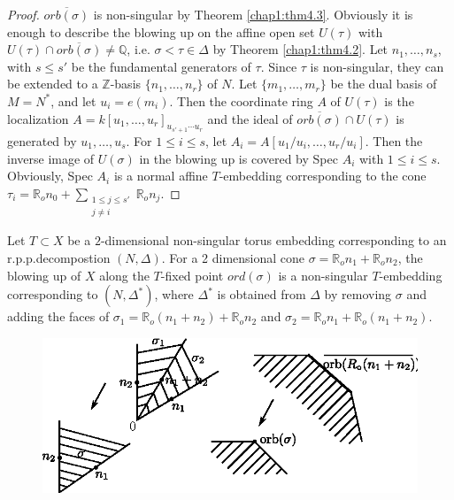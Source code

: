  \begin{proof}
$\overline{orb (\sigma)}$ is non-singular by Theorem
   \ref{chap1:thm4.3}. Obviously it 
   is enough to describe the blowing up on the affine open set
   $U(\tau)$ with $U(\tau) \cap \overline{orb(\sigma)} \neq
   \mathbb{Q}$, i.e. $\sigma < \tau \in \Delta$ by Theorem
   \ref{chap1:thm4.2}. Let   $n_1, \ldots, n_s$, with $s \le s'$ be
   the fundamental generators 
   of $\tau$. Since $\tau$ is non-singular, they can be extended to a
   $\mathbb{Z}$-basis $\{n_1, \ldots , n_r\}$ of $N$. Let $\{m_1,
   \ldots , m_r\}$ be the dual basis of $M=N^*$, and let
   $u_i=e(m_i)$. Then the coordinate ring  $A$ of $U(\tau)$ is the
   localization $A=k[u_1, \ldots ,u_r]_{u_{s'+1} \cdots u_r}$ and the
   ideal of $\overline{orb(\sigma)}\cap U (\tau)$ is generated by
   $u_1, \ldots , u_s$. For $1 \leq i \leq s$, let $A_i = A[u_1/u_i,
     \ldots , u_r/u_i]$. Then the inverse image of $U(\sigma)$ in the
   blowing up is covered by Spec $A_i$ with $1 \leq i \leq
   s$. Obviously, Spec $A_i$ is a normal affine $T$-embedding
   corresponding to the cone $\tau_i = \mathbb{R}_o n_0 +
   \sum\limits_{\substack{1 \le j \le s' \\ j \neq i}} \mathbb{R}_o
   n_j$.  
 \end{proof} 

 \setcounter{coro}{4}
 \begin{coro}\label{chap1:coro7.5}%
Let $T \subset X$ be a $2$-dimensional non-singular torus embedding
corresponding to an r.p.p.decompostion $(N , \Delta)$. For a
2 dimensional cone $\sigma= \mathbb{R}_o n_1+ \mathbb{R}_on_2$, the
blowing up of $X$ along the $T$-fixed point $ord(\sigma)$ is a
non-singular $T$-embedding corresponding to $(N, \Delta^*)$, where
$\Delta^*$ is obtained from $\Delta$ by removing $\sigma$ and adding
the faces of $\sigma_1 =\mathbb{R}_o(n_1+n_2)+ \mathbb{R}_o n_2$ and
$\sigma_2 = \mathbb{R}_o n_1 + \mathbb{R}_o(n_1 + n_2)$.  
\begin{figure}[H]
\centering 
\includegraphics{vol58-fig/fig58-8.eps} 
\end{figure}

 \end{coro}\pageoriginale

